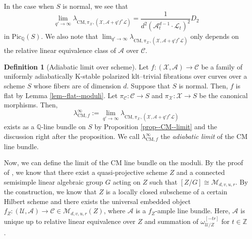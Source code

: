 \documentclass[12pt,twoside]{amsart}
\theoremstyle{definition}
\newtheorem{defn}[thm]{Definition}
\begin{document}
In the case when $S$ is normal, we see that 
\[\lim_{q'\to\infty}\lambda_{\mathrm{CM},\pi_{\mathcal{X}},(\mathcal{X},\mathcal{A}+q'f^*\mathcal{L})}=\frac{1}{d^2(\mathcal{A}_t^{d-1}\cdot \mathcal{L}_t)^2}D_2
\]
in $\mathrm{Pic}_{\mathbb{Q}}(S)$. 
We also note that $\lim_{q'\to\infty}\lambda_{\mathrm{CM},\pi_{\mathcal{X}},(\mathcal{X},\mathcal{A}+q'f^*\mathcal{L})}$ only depends on the relative linear equivalence class of $\mathcal{A}$ over $\mathcal{C}$.

\begin{defn}[Adiabatic limit over scheme]\label{defn--CM--limit}
    Let $f\colon (\mathcal{X},\mathcal{A})\to \mathcal{C}$ be a family of uniformly adiabatically K-stable polarized klt--trivial fibrations over curves over a scheme $S$ whose fibers are of dimension $d$. 
    Suppose that $S$ is normal.
    Then, $f$ is flat by Lemma \ref{lem--flat--moduli}.
Let $\pi_{\mathcal{C}}\colon \mathcal{C}\to S$ and $\pi_{\mathcal{X}}\colon \mathcal{X}\to S$ be the canonical morphisms.
Then, 
$$\lambda_{\mathrm{CM},f}^\infty:=\lim_{q'\to\infty}\lambda_{\mathrm{CM},\pi_{\mathcal{X}},(\mathcal{X},\mathcal{A}+q'f^*\mathcal{L})}$$
 exists as a $\mathbb{Q}$-line bundle on $S$ by Proposition \ref{prop--CM--limit} and the discussion right after the proposition. 
We call $\lambda_{\mathrm{CM},f}^\infty$ the {\em adiabatic limit} of the CM line bundle.
\end{defn}

Now, we can define the limit of the CM line bundle on the moduli.
By the proof of \cite[Theorem 5.1]{HH}, we know that there exist a quasi-projective scheme $Z$ and a connected semisimple linear algebraic group $G$ acting on $Z$ such that $[Z/G]\cong \mathcal{M}_{d,v,u,r}$.
By the construction, we know that $Z$ is a locally closed subscheme of a certain Hilbert scheme and there exists the universal embedded object $f_Z\colon (\mathcal{U},\mathcal{A})\to \mathcal{C}\in \mathcal{M}_{d,v,u,r}(Z)$, where $\mathcal{A}$ is a $f_Z$-ample line bundle.
Here, $\mathcal{A}$ is unique up to relative linear equivalence over $Z$ and summation of $\omega^{[-tr]}_{\mathcal{U}/Z}$ for $t\in\mathbb{Z}$.
\end{document}
